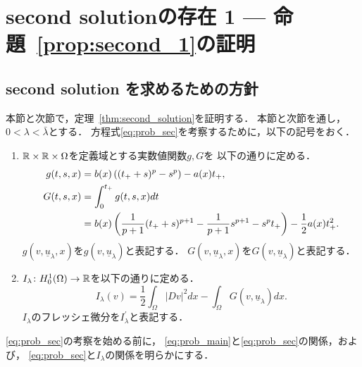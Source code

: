 \section{second solutionの存在 1 --- 命題~\ref{prop:second_1}の証明} \label{sec:second_sol}

\subsection{second solution を求めるための方針}

本節と次節で，定理~\ref{thm:second_solution}を証明する．
本節と次節を通し，$0 < \lambda < \bar{\lambda}$とする．
方程式\ref{eq:prob_sec}を考察するために，以下の記号をおく．

\begin{nota}
 \begin{enumerate}[1.]
  \item $\mathbb{R} \times \mathbb{R} \times \Omega$を定義域とする実数値関数$g, G$を
        以下の通りに定める．
        \begin{align}
         g(t, s, x) &= b(x) \left( (t_+ + s)^p - s^p \right) - a(x) t_+, 
         \label{eq:def_g} \\
         G(t, s, x) &= \int_0^{t_+} g(t, s, x) dt
         \notag \\
         &= b(x) \left( \frac{1}{p+1} (t_+ + s)^{p+1} - \frac{1}{p+1}
         s^{p+1} - s^p t_+ \right) - \frac{1}{2} a(x) t_+^2.
         \label{eq:def_G}
        \end{align}
        $g(v, \underline{u}_\lambda, x)$を$g(v, \underline{u}_\lambda
        )$と表記する．
        $G(v,\underline{u}_\lambda, x)$を$G(v, \underline{u}_\lambda
        )$と表記する．
  \item $I_{\lambda} \colon H_0^1(\Omega) \to \mathbb{R}$を以下の通りに定める．
        \begin{equation}
         I_\lambda (v) = \frac{1}{2} \int_\Omega \lvert Dv \rvert^2 dx
          - \int_\Omega G(v, \underline{u}_\lambda) dx. \label{eq:def_I}
        \end{equation}
        $I_\lambda$のフレッシェ微分を$I_\lambda^\prime$と表記する．
 \end{enumerate}
\end{nota}

\ref{eq:prob_sec}の考察を始める前に，
\ref{eq:prob_main}と\ref{eq:prob_sec}の関係，および，
\ref{eq:prob_sec}と$I_\lambda$の関係を明らかにする．


